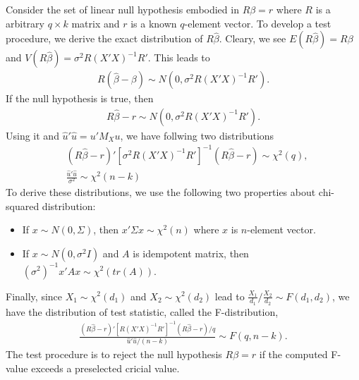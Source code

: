 \documentclass[
  12pt,
]{article}
\providecommand{\tightlist}{%
  \setlength{\itemsep}{0pt}\setlength{\parskip}{0pt}}
\begin{document}
Consider the set of linear null hypothesis embodied in \(R \beta = r\)
where \(R\) is a arbitrary \(q \times k\) matrix and \(r\) is a known \(q\)-element vector.
To develop a test procedure, we derive the exact distribution of \(R\hat{\beta}\).
Cleary, we see \(E(R\hat{\beta}) = R\beta\) and \(V(R\hat{\beta}) = \sigma^2 R (X'X)^{-1} R'\).
This leads to
\begin{align*}
  R(\hat{\beta} - \beta) \sim N(0, \sigma^2 R (X'X)^{-1} R').
\end{align*}
If the null hypothesis is true, then
\begin{align*}
  R\hat{\beta} - r \sim N(0, \sigma^2 R (X'X)^{-1} R').
\end{align*}
Using it and \(\hat{u}'\hat{u} = u' M_X u\), we have follwing two distributions
\begin{align*}
  &(R\hat{\beta} - r)'[\sigma^2 R (X'X)^{-1} R']^{-1}(R\hat{\beta} - r) \sim \chi^2(q),  \\
  &\frac{\hat{u}'\hat{u}}{\sigma^2} \sim \chi^2(n - k)
\end{align*}
To derive these distributions, we use the following two properties about chi-squared distribution:

\begin{itemize}
\tightlist
\item
  If \(x \sim N(0, \Sigma)\), then \(x'\Sigma x \sim \chi^2(n)\) where \(x\) is \(n\)-element vector.
\item
  If \(x \sim N(0, \sigma^2 I)\) and \(A\) is idempotent matrix, then \((\sigma^2)^{-1} x'Ax \sim \chi^2(tr(A))\).
\end{itemize}

Finally, since \(X_1 \sim \chi^2(d_1)\) and \(X_2 \sim \chi^2(d_2)\) lead to \(\frac{X_1}{d_1}/\frac{X_2}{d_2} \sim F(d_1, d_2)\),
we have the distribution of test statistic, called the F-distribution,
\begin{align*}
  \frac{(R\hat{\beta} - r)'[R (X'X)^{-1} R']^{-1}(R\hat{\beta} - r)/q}{\hat{u}'\hat{u}/(n - k)} \sim F(q, n-k).
\end{align*}
The test procedure is to reject the null hypothesis \(R\beta = r\) if the computed F-value exceeds a preselected cricial value.
\end{document}
